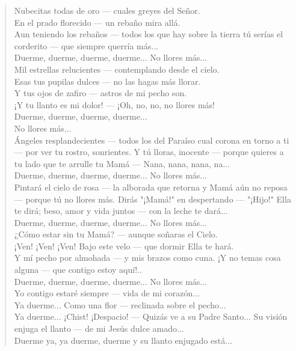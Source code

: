 \documentclass[12pt, twoside, openright]{book} %
\begin{document}
\begin{verse}
Nubecitas todas de oro — cuales greyes del Señor.\\
En el prado florecido — un rebaño mira allá. \\
Aun teniendo los rebaños — todos los que hay sobre la tierra tú serías el corderito — que siempre querría más... \\
Duerme, duerme, duerme, duerme... No llores más... \\
Mil estrellas relucientes — contemplando desde el cielo. \\
Esas tus pupilas dulces — no las hagas más llorar. \\
Y tus ojos de zafiro — astros de mi pecho son. \\
¡Y tu llanto es mi dolor! — ¡Oh, no, no, no llores más!\\
Duerme, duerme, duerme, duerme... \\
No llores más... \\
Ángeles resplandecientes — todos los del Paraíso cual corona en torno a ti — por ver tu rostro, sonrientes. Y tú lloras, inocente — porque quieres a tu lado que te arrulle tu Mamá — Nana, nana, nana, na... \\
Duerme, duerme, duerme, duerme... No llores más... \\
Pintará el cielo de rosa — la alborada que retorna y Mamá aún no reposa — porque tú no llores más. Dirás "¡Mamá!" en despertando — "¡Hijo!" Ella te dirá; beso, amor y vida juntos — con la leche te dará... \\
Duerme, duerme, duerme, duerme... No llores más... \\
¿Cómo estar sin tu Mamá? — aunque soñaras el Cielo.\\ 
¡Ven! ¡Ven! ¡Ven! Bajo este velo — que dormir Ella te hará. \\
Y mí pecho por almohada — y mis brazos como cuna. ¡Y no temas cosa alguna — que contigo estoy aquí!.. \\
Duerme, duerme, duerme, duerme... No llores más... \\
Yo contigo estaré siempre — vida de mi corazón... \\
Ya duerme... Como una flor — reclinada sobre el pecho... \\
Ya duerme... ¡Chist! ¡Despacio! — Quizás ve a su Padre Santo... Su visión enjuga el llanto — de mi Jesús dulce amado... \\
Duerme ya, ya duerme, duerme y su llanto enjugado está...
\end{verse} 
\end{document}
